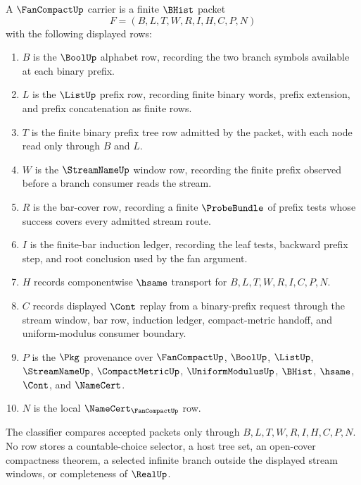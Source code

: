 \begin{definition}
\label{def:fan-compact-carrier}
A $\FanCompactUp$ carrier is a finite $\BHist$ packet
$$
F=(B,L,T,W,R,I,H,C,P,N)
$$
with the following displayed rows:
\begin{enumerate}
\item $B$ is the $\BoolUp$ alphabet row, recording the two branch symbols available at each binary prefix.
\item $L$ is the $\ListUp$ prefix row, recording finite binary words, prefix extension, and prefix concatenation as finite rows.
\item $T$ is the finite binary prefix tree row admitted by the packet, with each node read only through $B$ and $L$.
\item $W$ is the $\StreamNameUp$ window row, recording the finite prefix observed before a branch consumer reads the stream.
\item $R$ is the bar-cover row, recording a finite $\ProbeBundle$ of prefix tests whose success covers every admitted stream route.
\item $I$ is the finite-bar induction ledger, recording the leaf tests, backward prefix step, and root conclusion used by the fan argument.
\item $H$ records componentwise $\hsame$ transport for $B,L,T,W,R,I,C,P,N$.
\item $C$ records displayed $\Cont$ replay from a binary-prefix request through the stream window, bar row, induction ledger, compact-metric handoff, and uniform-modulus consumer boundary.
\item $P$ is the $\Pkg$ provenance over $\FanCompactUp$, $\BoolUp$, $\ListUp$, $\StreamNameUp$, $\CompactMetricUp$, $\UniformModulusUp$, $\BHist$, $\hsame$, $\Cont$, and $\NameCert$.
\item $N$ is the local $\NameCert_{\FanCompactUp}$ row.
\end{enumerate}
The classifier compares accepted packets only through $B,L,T,W,R,I,H,C,P,N$. No row stores a countable-choice selector, a host tree set, an open-cover compactness theorem, a selected infinite branch outside the displayed stream windows, or completeness of $\RealUp$.
\end{definition}

